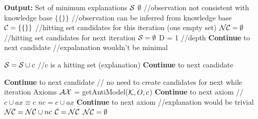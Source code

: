    \begin{algorithm}[t!]
    \begin{algorithmic}[1]
    	\State \textbf{Output:} Set of minimum explanations $\S$
			\State \Return $\emptyset$   //observation not consistent with knowledge base 
		\EndIf
			\State \Return $\{ \{ \} \}$ //observation can be inferred from knowledge base
		\EndIf
	\State $\C = \{ \{ \} \}$ //hitting set candidates for this iteration (one empty set)
	\State $\NC = \emptyset$ //hitting set candidates for next iteration
	\State $ \S = \emptyset $ 
	\State D = 1 //depth
					\State \textbf{Continue} to next candidate //expalanation wouldn't be minimal
				\EndIf
			\EndFor
			
					\State $\S = \S \cup c$ //c is a hitting set (explanation)
				\EndIf
				\State \textbf{Continue} to next candidate
			\EndIf
			
				\State \textbf{Continue} to next candidate // no need to create candidates for next while iteration
			\EndIf
			\State Axioms $\AX$ = getAntiModel($\K, O,  c$)
					\State \textbf{Continue} to next axiom //$c \cup ax \equiv c$
				\EndIf
				\State $nc = c \cup ax$
					\State \textbf{Continue} to next axiom //explanation would be trivial
				\EndIf
				\State $\NC = \NC \cup nc$
			\EndFor
		\EndFor
	\State $\C = \NC$
	\State $\NC = \emptyset$
	\EndWhile


\end{algorithmic}
\end{algorithm}
